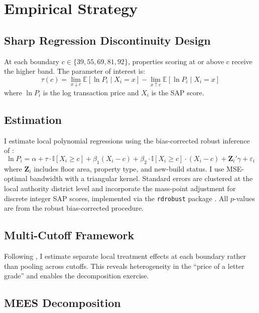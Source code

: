 \documentclass[12pt]{article}
\newcommand{\E}{\mathbb{E}}
\newcommand{\ind}{\mathbb{I}}
\begin{document}
\section{Empirical Strategy}\label{sec:strategy}

\subsection{Sharp Regression Discontinuity Design}

At each boundary $c \in \{39, 55, 69, 81, 92\}$, properties scoring at or above $c$ receive the higher band. The parameter of interest is:
\begin{equation}
\tau(c) = \lim_{x \downarrow c} \E[\ln P_i \mid X_i = x] - \lim_{x \uparrow c} \E[\ln P_i \mid X_i = x]
\end{equation}
where $\ln P_i$ is the log transaction price and $X_i$ is the SAP score.

\subsection{Estimation}

I estimate local polynomial regressions using the bias-corrected robust inference of \citet{calonico2014robust}:
\begin{equation}
\ln P_i = \alpha + \tau \cdot \ind[X_i \geq c] + \beta_1 (X_i - c) + \beta_2 \cdot \ind[X_i \geq c] \cdot (X_i - c) + \mathbf{Z}_i' \gamma + \varepsilon_i
\end{equation}
where $\mathbf{Z}_i$ includes floor area, property type, and new-build status. I use MSE-optimal bandwidth \citep{imbens2012optimal} with a triangular kernel. Standard errors are clustered at the local authority district level and incorporate the mass-point adjustment for discrete integer SAP scores, implemented via the \texttt{rdrobust} package \citep{cattaneo2019rdrobust}. All $p$-values are from the robust bias-corrected procedure.

\subsection{Multi-Cutoff Framework}

Following \citet{cattaneo2016interpreting}, I estimate separate local treatment effects at each boundary rather than pooling across cutoffs. This reveals heterogeneity in the ``price of a letter grade'' and enables the decomposition exercise.

\subsection{MEES Decomposition}
\end{document}
